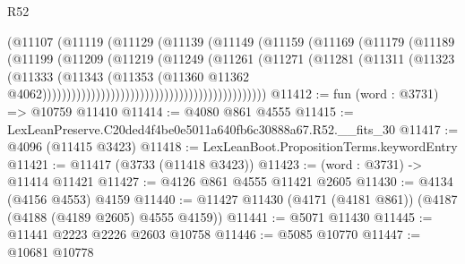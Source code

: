 \begin{lexlean}{R52}
\begin{coremodule}
                                                    (@11107
                                                      (@11119
                                                        (@11129
                                                          (@11139
                                                            (@11149
                                                              (@11159
                                                                (@11169
                                                                  (@11179
                                                                    (@11189
                                                                      (@11199
                                                                        (@11209
                                                                          (@11219
                                                                            (@11249
                                                                              (@11261
                                                                                (@11271
                                                                                  (@11281
                                                                                    (@11311
                                                                                      (@11323
                                                                                        (@11333
                                                                                          (@11343
                                                                                            (@11353
                                                                                              (@11360
                                                                                                @11362
                                                                                                @4062))))))))))))))))))))))))))))))))))))))))))))))
@11412 := fun (word : @3731) => @10759 @11410
@11414 := @4080 @861 @4555
@11415 := LexLeanPreserve.C20ded4f4be0e5011a640fb6c30888a67.R52.__fits_30
@11417 := @4096 (@11415 @3423)
@11418 := LexLeanBoot.PropositionTerms.keywordEntry
@11421 := @11417 (@3733 (@11418 @3423))
@11423 := (word : @3731) -> @11414 @11421
@11427 := @4126 @861 @4555 @11421 @2605
@11430 := @4134 (@4156 @4553) @4159
@11440 := @11427 @11430 (@4171 (@4181 @861)) (@4187 (@4188 (@4189 @2605) @4555 @4159))
@11441 := @5071 @11430
@11445 := @11441 @2223 @2226 @2603 @10758
@11446 := @5085 @10770
@11447 := @10681 @10778

\end{coremodule}
\end{lexlean}
